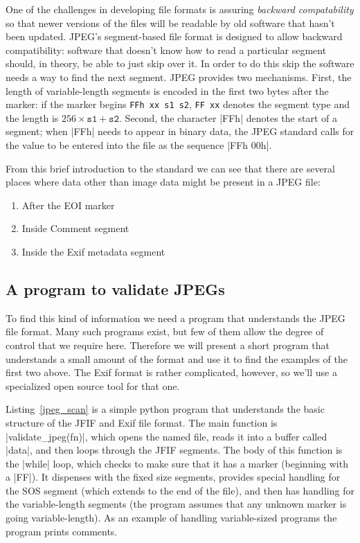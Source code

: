 One of the challenges in developing file formats is assuring
\emph{backward compatability} so that newer versions of the files will
be readable by old software that hasn't been updated. JPEG's
segment-based file format is designed to allow backward compatibility:
software that doesn't know how to read a particular segment should, in
theory, be able to just skip over it. In order to do this skip the
software needs a way to find the next segment. JPEG provides two
mechanisms. First, the length of variable-length segments is encoded
in the first two bytes after the marker: if the marker begins \texttt{FFh xx
  s1 s2}, \texttt{FF xx} denotes the segment type and the length
is $256 \times \texttt{s1} + \texttt{s2}$. Second, the character |FFh|
denotes the start of a segment; when |FFh| needs to appear in binary
data, the JPEG standard calls for the value to be entered into the
file as the sequence |FFh 00h|.

From this brief introduction to the standard we can see that there are  several places where
data other than image data might be present in a JPEG file:

\begin{enumerate}
\item After the EOI marker
\item Inside Comment segment
\item Inside the Exif metadata segment
\end{enumerate}

\subsection{A program to validate JPEGs}

To find this kind of information we need a program that understands
the JPEG file format. Many such programs exist, but few of them allow
the degree of control that we require here. Therefore we will present
a short program that understands a small amount of the format and use
it to find the examples of the first two above. The Exif format is
rather complicated, however, so we'll use a specialized open source
tool for that one.



Listing~\ref{jpeg_scan} is a simple python program that understands
the basic structure of the JFIF and Exif file format. The main
function is |validate_jpeg(fn)|, which opens the named file, reads it
into a buffer called |data|, and then loops through the JFIF
segments. The body of this function is the |while| loop, which checks
to make sure that it has a marker (beginning with a |FF|). It
dispenses with the fixed size segments, provides special handling for
the SOS segment (which extends to the end of the file), and then has
handling for the variable-length segments (the program assumes that
any unknown marker is going variable-length). As an example of
handling variable-sized programs the program prints comments.

